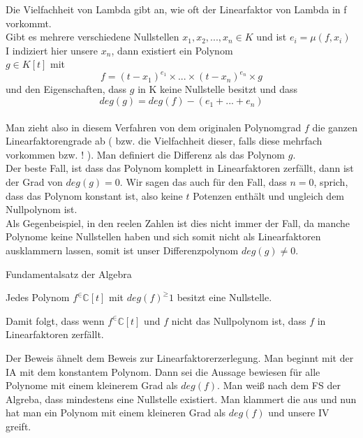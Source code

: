 \documentclass[smallheadings,12pt,a4paper]{scrartcl}
\begin{document}
Die Vielfachheit von Lambda gibt an, wie oft der Linearfaktor von Lambda in f vorkommt. \\
Gibt es mehrere verschiedene Nullstellen $x_1 , x_2 , ... , x_n  \in K $ und ist $e_i = \mu(f, x_i) $ I indiziert hier unsere $x_n$, dann existiert ein Polynom \\
$g\in K[t]$ mit 
$$ f = (t-x_1)^{e_1} \times ... \times (t-x_n)^{e_n} \times g $$ und den Eigenschaften, dass $g$ in K keine Nullstelle besitzt und dass 
$$ deg(g) = deg(f) - (e_1+...+e_n) $$ \\

Man zieht also in diesem Verfahren von dem originalen Polynomgrad $f$ die ganzen Linearfaktorengrade ab ( bzw. die Vielfachheit dieser, falls diese mehrfach vorkommen bzw. ! ). Man definiert die Differenz als das Polynom $g$. \\

Der beste Fall, ist dass das Polynom komplett in Linearfaktoren zerfällt, dann ist der Grad von $deg(g)=0$. Wir sagen das auch für den Fall, dass $n=0$, sprich, dass das Polynom konstant ist, also keine $t$ Potenzen enthält und ungleich dem Nullpolynom ist. \\

Als Gegenbeispiel, in den reelen Zahlen ist dies nicht immer der Fall, da manche Polynome keine Nullstellen haben und sich somit nicht als Linearfaktoren ausklammern lassen, somit ist unser Differenzpolynom $deg(g) \neq 0 $. \\

\begin{center}
\item[Fundamentalsatz der Algebra]
\end{center}
\item Jedes Polynom $f ^\in \mathbb{C}[t]$ mit $deg(f) ^\geq 1 $ besitzt eine Nullstelle. \\
\item Damit folgt, dass wenn $f ^\in \mathbb{C}[t]$ und $f$ nicht das Nullpolynom ist, dass $f$ in Linearfaktoren zerfällt.
\item Der Beweis ähnelt dem Beweis zur Linearfaktorerzerlegung. Man beginnt mit der IA mit dem konstantem Polynom. Dann sei die Aussage bewiesen für alle Polynome mit einem kleinerem Grad als $deg(f)$. Man weiß nach dem FS der Algreba, dass mindestens eine Nullstelle existiert. Man klammert die aus und nun hat man ein Polynom mit einem kleineren Grad als $deg(f)$ und unsere IV greift.  \\
\end{document}
